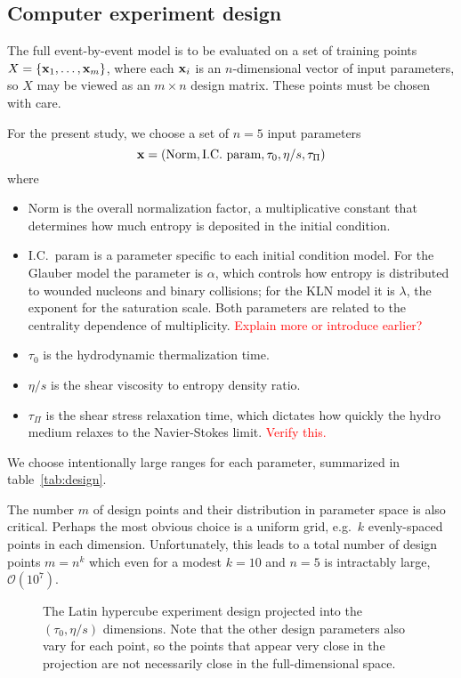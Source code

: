 \documentclass[aps,prc,reprint,amsmath]{revtex4-1}
\newcommand{\todo}[1]{\textcolor{red}{#1}}
\newcommand{\placeholderfig}[3][t]{
  \begin{figure}[#1]
    \centering
    \framebox{\parbox[c][.5\columnwidth]{\columnwidth}{
      placeholder
    }}
    \caption{\label{fig:#2}#3}
  \end{figure}
}
\begin{document}
\subsection{Computer experiment design}

The full event-by-event model is to be evaluated on a set of training points $X = \{\mathbf x_1, \ldots, \mathbf x_m\}$, where each $\mathbf x_i$ is an $n$-dimensional vector of input parameters, so $X$ may be viewed as an $m \times n$ design matrix.
These points must be chosen with care.

For the present study, we choose a set of $n = 5$ input parameters
\begin{equation}
  \mathbf x = (\text{Norm}, \text{I.C.\ param}, \tau_0, \eta/s, \tau_\Pi)
\end{equation}
where
\begin{itemize}
  \item Norm is the overall normalization factor, a multiplicative constant that determines how much entropy is deposited in the initial condition.
  \item I.C.\ param is a parameter specific to each initial condition model.
    For the Glauber model the parameter is $\alpha$, which controls how entropy is distributed to wounded nucleons and binary collisions;
    for the KLN model it is $\lambda$, the exponent for the saturation scale.
    Both parameters are related to the centrality dependence of multiplicity.
    \todo{Explain more or introduce earlier?}
  \item $\tau_0$ is the hydrodynamic thermalization time.
  \item $\eta/s$ is the shear viscosity to entropy density ratio.
  \item $\tau_\Pi$ is the shear stress relaxation time, which dictates how quickly the hydro medium relaxes to the Navier-Stokes limit.
    \todo{Verify this.}
\end{itemize}
We choose intentionally large ranges for each parameter, summarized in table~\ref{tab:design}.

The number $m$ of design points and their distribution in parameter space is also critical.
Perhaps the most obvious choice is a uniform grid, e.g.\ $k$ evenly-spaced points in each dimension.
Unfortunately, this leads to a total number of design points $m = n^k$ which even for a modest $k = 10$ and $n = 5$ is intractably large, $\mathcal O(10^7)$.

\placeholderfig{design}{
  The Latin hypercube experiment design projected into the $(\tau_0, \eta/s)$ dimensions.
  Note that the other design parameters also vary for each point, so the points that appear very close in the projection are not necessarily close in the full-dimensional space.
}
\end{document}
